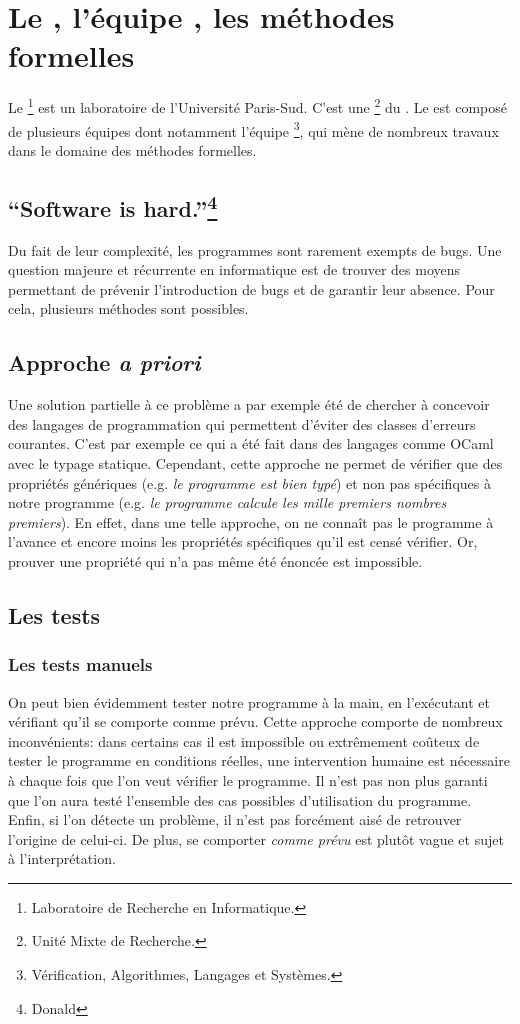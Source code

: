 \section{Le , l'équipe , les méthodes formelles}

  Le \footnote{Laboratoire de Recherche en Informatique.} est un laboratoire de l'Université Paris-Sud. C'est une \footnote{Unité Mixte de Recherche.} du . Le  est composé de plusieurs équipes dont notamment l'équipe \footnote{Vérification, Algorithmes, Langages et Systèmes.}, qui mène de nombreux travaux dans le domaine des méthodes formelles.

  \subsection{\enquote{Software is hard.}\texorpdfstring{\protect\footnote{Donald }}{}}

  Du fait de leur complexité, les programmes sont rarement exempts de bugs. Une question majeure et récurrente en informatique est de trouver des moyens permettant de prévenir l'introduction de bugs et de garantir leur absence. Pour cela, plusieurs méthodes sont possibles.

  \subsection{Approche \emph{a priori}}

  Une solution partielle à ce problème a par exemple été de chercher à concevoir des langages de programmation qui permettent d'éviter des classes d'erreurs courantes. C'est par exemple ce qui a été fait dans des langages comme OCaml avec le typage statique. Cependant, cette approche ne permet de vérifier que des propriétés génériques (e.g. \emph{le programme est bien typé}) et non pas spécifiques à notre programme (e.g. \emph{le programme calcule les mille premiers nombres premiers}). En effet, dans une telle approche, on ne connaît pas le programme à l'avance et encore moins les propriétés spécifiques qu'il est censé vérifier. Or, prouver une propriété qui n'a pas même été énoncée est impossible.

  \subsection{Les tests}
    \subsubsection{Les tests manuels}
    On peut bien évidemment tester notre programme à la main, en l'exécutant et vérifiant qu'il se comporte comme prévu. Cette approche comporte de nombreux inconvénients: dans certains cas il est impossible ou extrêmement coûteux de tester le programme en conditions réelles, une intervention humaine est nécessaire à chaque fois que l'on veut vérifier le programme. Il n'est pas non plus garanti que l'on aura testé l'ensemble des cas possibles d'utilisation du programme. Enfin, si l'on détecte un problème, il n'est pas forcément aisé de retrouver l'origine de celui-ci. De plus, se comporter \emph{comme prévu} est plutôt vague et sujet à l'interprétation.

